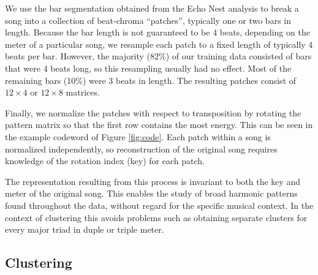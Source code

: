 \documentclass{article}
\begin{document}
We use the bar segmentation obtained from the Echo Nest analysis to
break a song into a collection of beat-chroma ``patches'', typically
one or two bars in length.
%
Because the bar length is not guaranteed to be 4 beats, 
depending on the meter of a particular
song, we resample each patch to a fixed length of typically 4 beats
per bar.  However, the majority (82\%) of our training data
consisted of bars that were 4 beats long, so this resampling 
usually had no effect.  Most of the remaining bars (10\%) were 3 beats in
length.
The resulting patches consist of $12 \times 4$ or $12 \times 8$ matrices.

Finally, we normalize the patches with respect to transposition by rotating
the pattern matrix so that the first row contains the most
energy. This can be seen in the example codeword of Figure \ref{fig:code}.
Each patch within a song is normalized independently, so
reconstruction of the original song requires knowledge of the
rotation index (key) for each patch.

The representation resulting from this process is invariant to both
the key and meter of the original song.  This enables the study of
broad harmonic patterns found throughout the data, without regard for
the specific musical context.
%
In the context of clustering this avoids problems such as obtaining separate
clusters for every major triad in duple or triple meter.
%

\subsection{Clustering}

\end{document}
